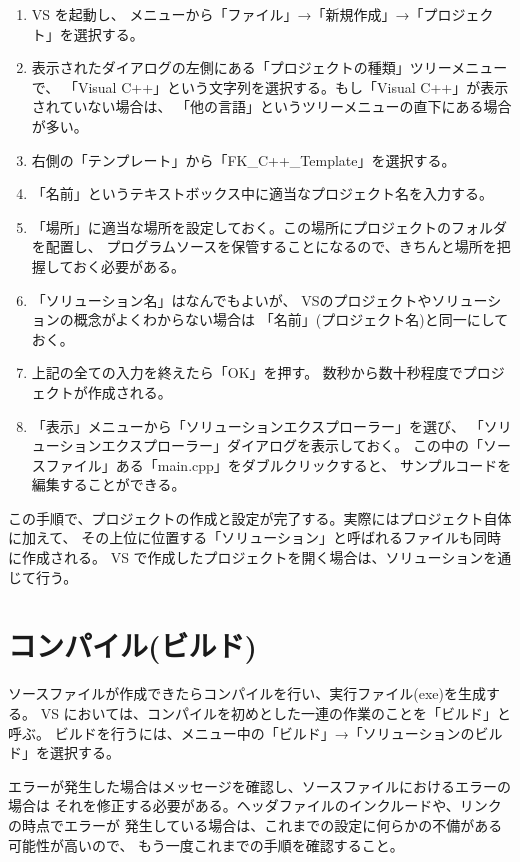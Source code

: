\documentclass[a4paper]{jsarticle}
\begin{document}
\begin{enumerate}
 \item VS を起動し、
	メニューから「ファイル」→「新規作成」→「プロジェクト」を選択する。
 \item 表示されたダイアログの左側にある「プロジェクトの種類」ツリーメニューで、
	「Visual C++」という文字列を選択する。もし「Visual C++」が表示されていない場合は、
	「他の言語」というツリーメニューの直下にある場合が多い。
 \item 右側の「テンプレート」から「FK\_C++\_Template」を選択する。
 \item 「名前」というテキストボックス中に適当なプロジェクト名を入力する。
 \item 「場所」に適当な場所を設定しておく。この場所にプロジェクトのフォルダを配置し、
	プログラムソースを保管することになるので、きちんと場所を把握しておく必要がある。
 \item 「ソリューション名」はなんでもよいが、
	VSのプロジェクトやソリューションの概念がよくわからない場合は
	「名前」(プロジェクト名)と同一にしておく。
 \item 上記の全ての入力を終えたら「OK」を押す。
	数秒から数十秒程度でプロジェクトが作成される。
 \item 「表示」メニューから「ソリューションエクスプローラー」を選び、
	「ソリューションエクスプローラー」ダイアログを表示しておく。
	この中の「ソースファイル」ある「main.cpp」をダブルクリックすると、
	サンプルコードを編集することができる。
\end{enumerate}

この手順で、プロジェクトの作成と設定が完了する。実際にはプロジェクト自体に加えて、
その上位に位置する「ソリューション」と呼ばれるファイルも同時に作成される。
VS で作成したプロジェクトを開く場合は、ソリューションを通じて行う。

\section{コンパイル(ビルド)}
ソースファイルが作成できたらコンパイルを行い、実行ファイル(exe)を生成する。
VS においては、コンパイルを初めとした一連の作業のことを「ビルド」と呼ぶ。
ビルドを行うには、メニュー中の「ビルド」→「ソリューションのビルド」を選択する。

エラーが発生した場合はメッセージを確認し、ソースファイルにおけるエラーの場合は
それを修正する必要がある。ヘッダファイルのインクルードや、リンクの時点でエラーが
発生している場合は、これまでの設定に何らかの不備がある可能性が高いので、
もう一度これまでの手順を確認すること。
\end{document}
